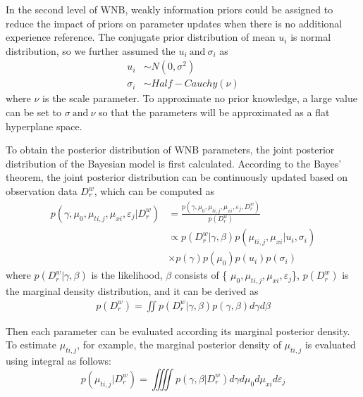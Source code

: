 \documentclass[journal,twoside,web]{ieeecolor}
\begin{document}
In the second level of WNB, weakly information priors could be assigned to reduce the impact of priors on parameter updates when there is no additional experience reference\cite{7974778}. The conjugate prior distribution of mean $ u_{i} $ is normal distribution, so we further assumed the $u_{i} ~\text{and} ~\sigma_{i} $ as
\begin{equation}\label{eq6prior}
\begin{aligned}
u_{i} & \sim  N(0, \sigma^{2}) \\
\sigma_{i} & \sim  Half-Cauchy(\nu)
\end{aligned}
\end{equation}
where $ \nu $ is the scale parameter. To approximate no prior knowledge, a large value can be set to $ \sigma ~ \text{and} ~ \nu $ so that the parameters will be approximated as a flat hyperplane space.

To obtain the posterior distribution of WNB parameters, the joint posterior distribution of the Bayesian model is first calculated. According to the Bayes' theorem, the joint posterior distribution can be continuously updated based on observation data $ D_{r}^{w} $, which can be computed as
\begin{equation}\label{eq7posterior}
\begin{aligned}
p( \gamma, \mu_{0} , \mu_{ti,j}, \mu_{xi}, \varepsilon_{j}| D_{r}^{w} )  & =  \frac{p(\gamma, \mu_{0} , \mu_{ti,j}, \mu_{xi}, \varepsilon_{j}, D_{r}^{w})}{p(D_{r}^{w})} \\
& \propto p(D_{r}^{w}| \gamma, \beta ) p(\mu_{ti,j},\mu_{xi}| u_{i}, \sigma_{i}) \\
& \times p(\gamma) p( \mu_{0} ) p(u_{i} ) p(\sigma_{i})
\end{aligned}
\end{equation}
where $ p(D_{r}^{w}| \gamma, \beta ) $ is the likelihood, $ \beta $ consists of \{ $ \mu_{0} , \mu_{ti,j}, \mu_{xi}, \varepsilon_{j} $\}, $ p(D_{r}^{w}) $ is the  marginal density distribution, and it can be derived as
\begin{equation}\label{eq8posterior}
\begin{aligned}
p(D_{r}^{w}) = \iint p(D_{r}^{w}| \gamma, \beta ) p(\gamma, \beta)d\gamma d\beta
\end{aligned}
\end{equation}

Then each parameter can be evaluated according its marginal posterior density. To estimate $ \mu_{ti,j}  $, for example, the marginal posterior density of  $ \mu_{ti,j}  $ is evaluated using integral as follows:
\begin{equation}\label{eq9posterior}
p(\mu_{ti,j} |D_{r}^{w}) = \iiiint p( \gamma, \beta| D_{r}^{w} ) d\gamma d\mu_{0} d\mu_{xi} d\varepsilon_{j}
\end{equation}
\end{document}

